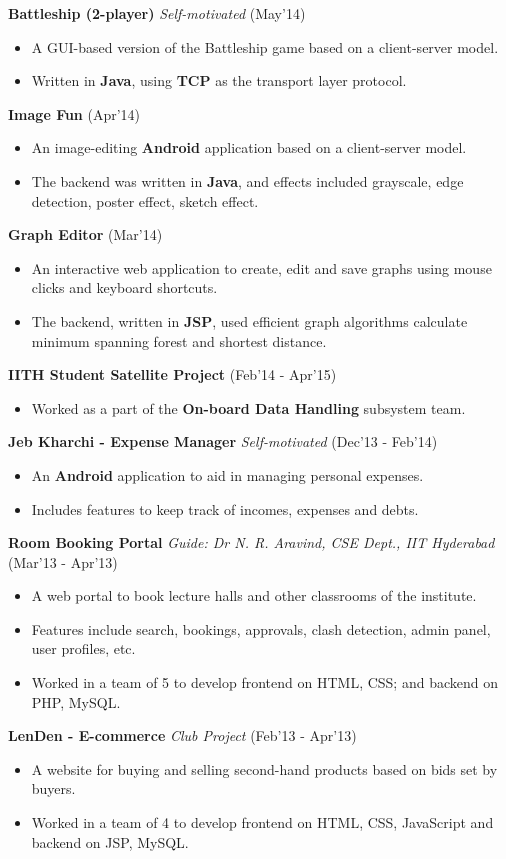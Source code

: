 \documentclass[9pt]{extarticle}
\begin{document}
\space
\textbf{Battleship (2-player)} \textit{Self-motivated} \hfill (May'14)
\begin{itemize}
\item A GUI-based version of the Battleship game based on a client-server model.
\item Written in \textbf{Java}, using \textbf{TCP} as the transport layer protocol.
\end{itemize}
\textbf{Image Fun} \hfill (Apr'14)
\begin{itemize}
\item An image-editing \textbf{Android} application based on a client-server model.
\item The backend was written in \textbf{Java}, and effects included grayscale, edge detection, poster effect, sketch effect.
\end{itemize}
\space
\textbf{Graph Editor} \hfill (Mar'14)
\begin{itemize}
\item An interactive web application to create, edit and save graphs using mouse clicks and keyboard shortcuts.
\item The backend, written in \textbf{JSP}, used efficient graph algorithms calculate minimum spanning forest and shortest distance.
\end{itemize}
\space
\textbf{IITH Student Satellite Project} \hfill (Feb'14 - Apr'15)
\begin{itemize}
\item Worked as a part of the \textbf{On-board Data Handling} subsystem team.
\end{itemize}
\space
\textbf{Jeb Kharchi - Expense Manager} \textit{Self-motivated} \hfill (Dec'13 - Feb'14)
\begin{itemize}
\item An \textbf{Android} application to aid in managing personal expenses.
\item Includes features to keep track of incomes, expenses and debts.
\end{itemize}
\space
\textbf{Room Booking Portal} \textit{Guide: Dr N. R. Aravind, CSE Dept., IIT Hyderabad} \hfill (Mar'13 - Apr'13)
\begin{itemize}
\item A web portal to book lecture halls and other classrooms of the institute.
\item Features include search, bookings, approvals, clash detection, admin panel, user profiles, etc.
\item Worked in a team of 5 to develop frontend on HTML, CSS; and backend on PHP, MySQL.
\end{itemize}
\space
\textbf{LenDen - E-commerce} \textit{Club Project} \hfill (Feb'13 - Apr'13)
\begin{itemize}
\item A website for buying and selling second-hand products based on bids set by buyers.
\item Worked in a team of 4 to develop frontend on HTML, CSS, JavaScript and backend on JSP, MySQL.
\end{itemize}
\end{document}
